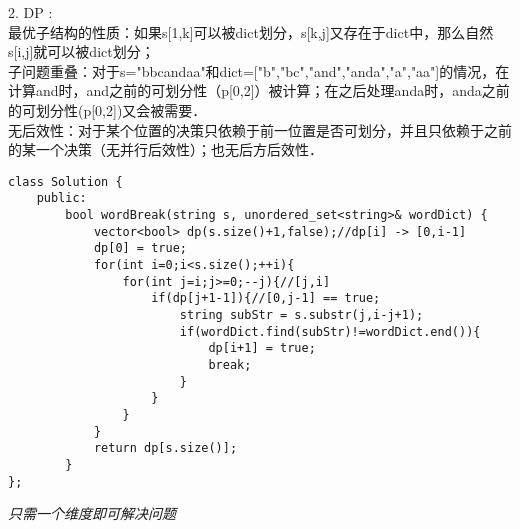 \begin{description}
	\item{2. DP} : \\
		最优子结构的性质：如果s[1,k]可以被dict划分，s[k,j]又存在于dict中，那么自然s[i,j]就可以被dict划分；\\
		子问题重叠：对于s="bbcandaa"和dict=["b","bc","and","anda","a","aa"]的情况，在计算and时，and之前的可划分性（p[0,2]）被计算；在之后处理anda时，anda之前的可划分性(p[0,2])又会被需要．\\
		无后效性：对于某个位置的决策只依赖于前一位置是否可划分，并且只依赖于之前的某一个决策（无并行后效性）；也无后方后效性．\\

    \begin{lstlisting}
class Solution {
	public:
		bool wordBreak(string s, unordered_set<string>& wordDict) {
			vector<bool> dp(s.size()+1,false);//dp[i] -> [0,i-1]
			dp[0] = true;
			for(int i=0;i<s.size();++i){
				for(int j=i;j>=0;--j){//[j,i]
					if(dp[j+1-1]){//[0,j-1] == true;
						string subStr = s.substr(j,i-j+1);
						if(wordDict.find(subStr)!=wordDict.end()){
							dp[i+1] = true;
							break;
						}
					}
				}
			}
			return dp[s.size()];
	    }
};
    \end{lstlisting}
	\textit{只需一个维度即可解决问题}
\end{description}


